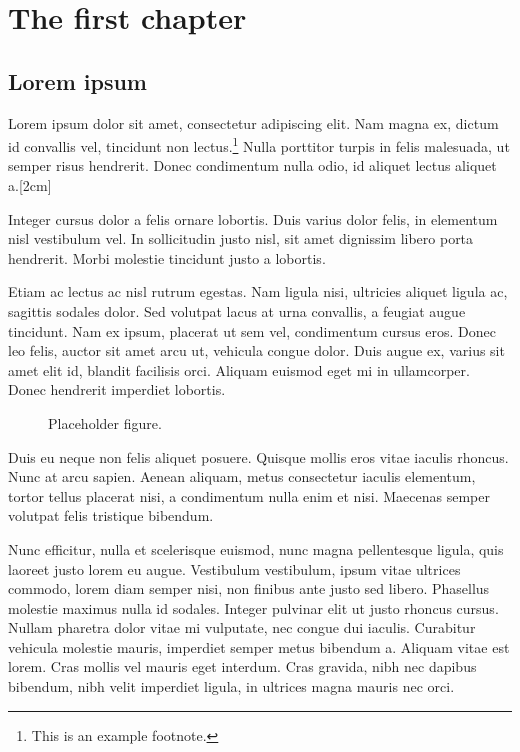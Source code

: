 \chapter{The first chapter}

\section{Lorem ipsum}

Lorem ipsum dolor sit amet, consectetur adipiscing elit. Nam magna ex, dictum id convallis vel, tincidunt non lectus.\footnote{This is an example footnote.} Nulla porttitor turpis in felis malesuada, ut semper risus hendrerit. Donec condimentum nulla odio, id aliquet lectus aliquet a.[2cm]

Integer cursus dolor a felis ornare lobortis. Duis varius dolor felis, in elementum nisl vestibulum vel. In sollicitudin justo nisl, sit amet dignissim libero porta hendrerit.\cite{Tianjun_1} Morbi molestie tincidunt justo a lobortis.\cite{McCulloch_Pitts_1}

Etiam ac lectus ac nisl rutrum egestas. Nam ligula nisi, ultricies aliquet ligula ac, sagittis sodales dolor. Sed volutpat lacus at urna convallis, a feugiat augue tincidunt. Nam ex ipsum, placerat ut sem vel, condimentum cursus eros. Donec leo felis, auctor sit amet arcu ut, vehicula congue dolor. Duis augue ex, varius sit amet elit id, blandit facilisis orci. Aliquam euismod eget mi in ullamcorper. Donec hendrerit imperdiet lobortis.

\begin{figure}[tbp]
\centering
{}
\caption{Placeholder figure.}
\end{figure}

Duis eu neque non felis aliquet posuere. Quisque mollis eros vitae iaculis rhoncus. Nunc at arcu sapien. Aenean aliquam, metus consectetur iaculis elementum, tortor tellus placerat nisi, a condimentum nulla enim et nisi. Maecenas semper volutpat felis tristique bibendum.

Nunc efficitur, nulla et scelerisque euismod, nunc magna pellentesque ligula, quis laoreet justo lorem eu augue. Vestibulum vestibulum, ipsum vitae ultrices commodo, lorem diam semper nisi, non finibus ante justo sed libero. Phasellus molestie maximus nulla id sodales. Integer pulvinar elit ut justo rhoncus cursus. Nullam pharetra dolor vitae mi vulputate, nec congue dui iaculis. Curabitur vehicula molestie mauris, imperdiet semper metus bibendum a. Aliquam vitae est lorem. Cras mollis vel mauris eget interdum. Cras gravida, nibh nec dapibus bibendum, nibh velit imperdiet ligula, in ultrices magna mauris nec orci. 

